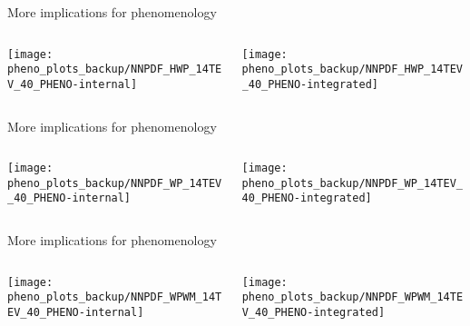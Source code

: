 \begin{frame}[t]{More implications for phenomenology}
    \begin{center}
        \begin{columns}
	        \begin{column}{0.48\textwidth}
	            \begin{center}
	                \texttt{[image: pheno\_plots\_backup/NNPDF\_HWP\_14TEV\_40\_PHENO-internal]} 
	            \end{center}
	        \end{column}
	        \begin{column}{0.48\textwidth}
	            \texttt{[image: pheno\_plots\_backup/NNPDF\_HWP\_14TEV\_40\_PHENO-integrated]}
	        \end{column}
        \end{columns}
    \end{center}
\end{frame}

\begin{frame}[t]{More implications for phenomenology}
    \begin{center}
        \begin{columns}
	        \begin{column}{0.48\textwidth}
	            \begin{center}
	                \texttt{[image: pheno\_plots\_backup/NNPDF\_WP\_14TEV\_40\_PHENO-internal]} 
	            \end{center}
	        \end{column}
	        \begin{column}{0.48\textwidth}
	            \texttt{[image: pheno\_plots\_backup/NNPDF\_WP\_14TEV\_40\_PHENO-integrated]}
	        \end{column}
        \end{columns}
    \end{center}
\end{frame}

\begin{frame}[t]{More implications for phenomenology}
    \begin{center}
        \begin{columns}
	        \begin{column}{0.48\textwidth}
	            \begin{center}
	                \texttt{[image: pheno\_plots\_backup/NNPDF\_WPWM\_14TEV\_40\_PHENO-internal]} 
	            \end{center}
	        \end{column}
	        \begin{column}{0.48\textwidth}
	            \texttt{[image: pheno\_plots\_backup/NNPDF\_WPWM\_14TEV\_40\_PHENO-integrated]}
	        \end{column}
        \end{columns}
    \end{center}
\end{frame}


